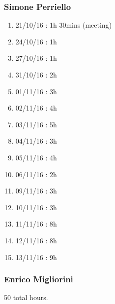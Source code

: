 \subsubsection{Simone Perriello}
\begin{enumerate}
\item21/10/16 : 1h 30mins (meeting)
\item24/10/16 : 1h 
\item27/10/16 : 1h
\item31/10/16 : 2h 
\item01/11/16 : 3h
\item02/11/16 : 4h
\item03/11/16 : 5h
\item04/11/16 : 3h
\item05/11/16 : 4h
\item06/11/16 : 2h
\item09/11/16 : 3h
\item10/11/16 : 3h
\item11/11/16 : 8h
\item12/11/16 : 8h
\item13/11/16 : 9h 
\end{enumerate}

\subsubsection{Enrico Migliorini}
50 total hours.